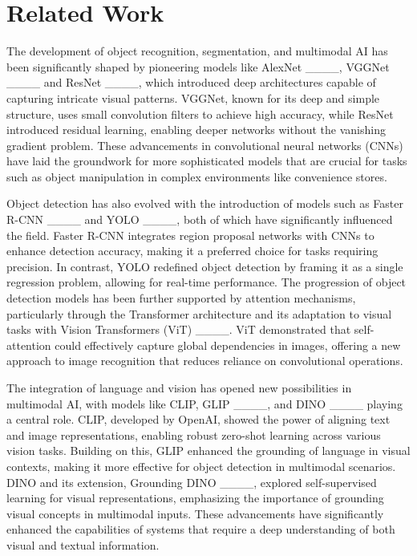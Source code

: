 \section{Related Work}
The development of object recognition, segmentation, and multimodal AI has been significantly shaped by pioneering models like AlexNet ____, VGGNet ____ and ResNet ____, which introduced deep architectures capable of capturing intricate visual patterns. VGGNet, known for its deep and simple structure, uses small convolution filters to achieve high accuracy, while ResNet introduced residual learning, enabling deeper networks without the vanishing gradient problem. These advancements in convolutional neural networks (CNNs) have laid the groundwork for more sophisticated models that are crucial for tasks such as object manipulation in complex environments like convenience stores.

Object detection has also evolved with the introduction of models such as Faster R-CNN ____ and YOLO ____, both of which have significantly influenced the field. Faster R-CNN integrates region proposal networks with CNNs to enhance detection accuracy, making it a preferred choice for tasks requiring precision. In contrast, YOLO redefined object detection by framing it as a single regression problem, allowing for real-time performance. The progression of object detection models has been further supported by attention mechanisms, particularly through the Transformer architecture and its adaptation to visual tasks with Vision Transformers (ViT) ____. ViT demonstrated that self-attention could effectively capture global dependencies in images, offering a new approach to image recognition that reduces reliance on convolutional operations.

The integration of language and vision has opened new possibilities in multimodal AI, with models like CLIP, GLIP 
____, and DINO ____ playing a central role. CLIP, developed by OpenAI, showed the power of aligning text and image representations, enabling robust zero-shot learning across various vision tasks. Building on this, GLIP enhanced the grounding of language in visual contexts, making it more effective for object detection in multimodal scenarios. DINO and its extension, Grounding DINO ____, explored self-supervised learning for visual representations, emphasizing the importance of grounding visual concepts in multimodal inputs. These advancements have significantly enhanced the capabilities of systems that require a deep understanding of both visual and textual information.

